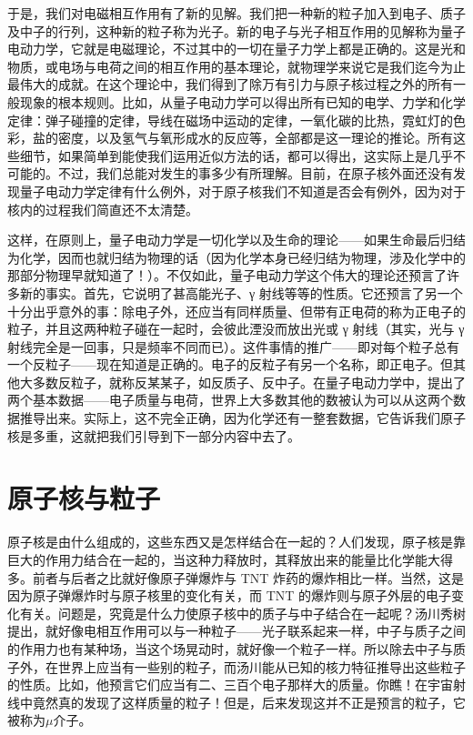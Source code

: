 于是，我们对电磁相互作用有了新的见解。我们把一种新的粒子加入到电子、质子及中子的行列，这种新的粒子称为光子。新的电子与光子相互作用的见解称为量子电动力学，它就是电磁理论，不过其中的一切在量子力学上都是正确的。这是光和物质，或电场与电荷之间的相互作用的基本理论，就物理学来说它是我们迄今为止最伟大的成就。在这个理论中，我们得到了除万有引力与原子核过程之外的所有一般现象的根本规则。比如，从量子电动力学可以得出所有已知的电学、力学和化学定律：弹子碰撞的定律，导线在磁场中运动的定律，一氧化碳的比热，霓虹灯的色彩，盐的密度，以及氢气与氧形成水的反应等，全部都是这一理论的推论。所有这些细节，如果简单到能使我们运用近似方法的话，都可以得出，这实际上是几乎不可能的。不过，我们总能对发生的事多少有所理解。目前，在原子核外面还没有发现量子电动力学定律有什么例外，对于原子核我们不知道是否会有例外，因为对于核内的过程我们简直还不太清楚。

这样，在原则上，量子电动力学是一切化学以及生命的理论——如果生命最后归结为化学，因而也就归结为物理的话（因为化学本身已经归结为物理，涉及化学中的那部分物理早就知道了！）。不仅如此，量子电动力学这个伟大的理论还预言了许多新的事实。首先，它说明了甚高能光子、γ 射线等等的性质。它还预言了另一个十分出乎意外的事：除电子外，还应当有同样质量、但带有正电荷的称为正电子的粒子，并且这两种粒子碰在一起时，会彼此湮没而放出光或 γ 射线（其实，光与 γ 射线完全是一回事，只是频率不同而已）。这件事情的推广——即对每个粒子总有一个反粒子——现在知道是正确的。电子的反粒子有另一个名称，即正电子。但其他大多数反粒子，就称反某某子，如反质子、反中子。在量子电动力学中，提出了两个基本数据——电子质量与电荷，世界上大多数其他的数被认为可以从这两个数据推导出来。实际上，这不完全正确，因为化学还有一整套数据，它告诉我们原子核是多重，这就把我们引导到下一部分内容中去了。


\section{原子核与粒子}

原子核是由什么组成的，这些东西又是怎样结合在一起的？人们发现，原子核是靠巨大的作用力结合在一起的，当这种力释放时，其释放出来的能量比化学能大得多。前者与后者之比就好像原子弹爆炸与 TNT 炸药的爆炸相比一样。当然，这是因为原子弹爆炸时与原子核里的变化有关，而 TNT 的爆炸则与原子外层的电子变化有关。问题是，究竟是什么力使原子核中的质子与中子结合在一起呢？汤川秀树提出，就好像电相互作用可以与一种粒子——光子联系起来一样，中子与质子之间的作用力也有某种场，当这个场晃动时，就好像一个粒子一样。所以除去中子与质子外，在世界上应当有一些别的粒子，而汤川能从已知的核力特征推导出这些粒子的性质。比如，他预言它们应当有二、三百个电子那样大的质量。你瞧！在宇宙射线中竟然真的发现了这样质量的粒子！但是，后来发现这并不正是预言的粒子，它被称为$\mu$介子。

